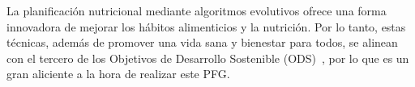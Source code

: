 La planificación nutricional mediante algoritmos evolutivos ofrece una forma innovadora de mejorar los hábitos alimenticios y la nutrición. Por lo tanto, estas técnicas, además de promover una vida sana y bienestar para todos, se alinean con el tercero de los Objetivos de Desarrollo Sostenible (ODS)~\cite{onu2024}, por lo que es un gran aliciente a la hora de realizar este PFG.

